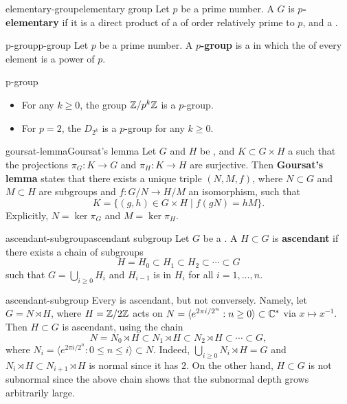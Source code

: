 \begin{topic}{elementary-group}{elementary group}
    Let $p$ be a prime number. A  $G$ is \textbf{$p$-elementary} if it is a direct product of a  of order relatively prime to $p$, and a .
\end{topic}

\begin{topic}{p-group}{p-group}
    Let $p$ be a prime number. A \textbf{$p$-group} is a  in which the  of every element is a power of $p$.
\end{topic}

\begin{example}{p-group}
    \begin{itemize}
        \item For any $k \ge 0$, the group $\mathbb{Z}/p^k \mathbb{Z}$ is a $p$-group.
        \item For $p = 2$, the  $D_{2^k}$ is a $p$-group for any $k \ge 0$.
    \end{itemize}
\end{example}

\begin{topic}{goursat-lemma}{Goursat's lemma}
    Let $G$ and $H$ be , and $K \subset G \times H$ a  such that the projections $\pi_G : K \to G$ and $\pi_H : K \to H$ are surjective. Then \textbf{Goursat's lemma} states that there exists a unique triple $(N, M, f)$, where $N \subset G$ and $M \subset H$ are  subgroups and $f : G/N \to H/M$ an isomorphism, such that
    \[ K = \{ (g, h) \in G \times H \mid f(gN) = hM \} . \]
    Explicitly, $N = \ker \pi_G$ and $M = \ker \pi_H$.
\end{topic}

\begin{topic}{ascendant-subgroup}{ascendant subgroup}
    Let $G$ be a . A  $H \subset G$ is \textbf{ascendant} if there exists a chain of subgroups
    \[ H = H_0 \subset H_1 \subset H_2 \subset \cdots \subset G \]
    such that $G = \bigcup_{i \ge 0} H_i$ and $H_{i - 1}$ is  in $H_i$ for all $i = 1, \ldots, n$.
\end{topic}

\begin{example}{ascendant-subgroup}
    Every  is ascendant, but not conversely. Namely, let $G = N \rtimes H$, where $H = \mathbb{Z}/2\mathbb{Z}$ acts on $N = \langle e^{2 \pi i / 2^n} : n \ge 0 \rangle \subset \mathbb{C}^*$ via $x \mapsto x^{-1}$. Then $H \subset G$ is ascendant, using the chain
    \[ N = N_0 \rtimes H \subset N_1 \rtimes H \subset N_2 \rtimes H \subset \cdots \subset G , \]
    where $N_i = \langle e^{2 \pi i / 2^n} : 0 \le n \le i \rangle \subset N$. Indeed, $\bigcup_{i \ge 0} N_i \rtimes H = G$ and $N_i \rtimes H \subset N_{i + 1} \rtimes H$ is normal since it has  $2$. On the other hand, $H \subset G$ is not subnormal since the above chain shows that the subnormal depth grows arbitrarily large.
\end{example}

